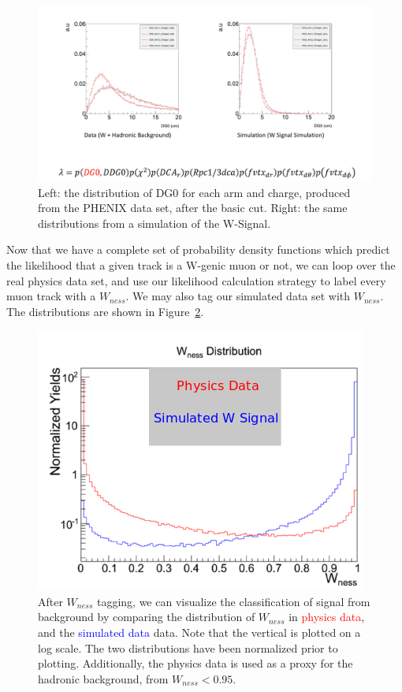 \begin{figure}
  \centering
  \includegraphics[width=\linewidth,trim=4 4 4 4,clip]{./figures/pdf_DG0.png}
  \caption{
    Left: the distribution of DG0 for each arm and charge, produced from the
    PHENIX data set, after the basic cut. Right: the same distributions from a
    simulation of the W-Signal.
  }
  \label{fig:pdf_DG0}
\end{figure}

Now that we have a complete set of probability density functions which predict
the likelihood that a given track is a W-genic muon or not, we can loop over the
real physics data set, and use our likelihood calculation strategy to label
every muon track with a $W_{ness}$. We may also tag our simulated data set with
$W_{ness}$. The distributions are shown in
Figure~\ref{fig:wness_distribution}.

\begin{figure}
  \centering
  \includegraphics[width=0.7\linewidth]{./figures/wness_sig_bak.png}
  \caption{
    After $W_{ness}$ tagging, we can visualize the classification of signal from
    background by comparing the distribution of $W_{ness}$ in
    \textcolor{red}{physics data}, and the \textcolor{blue}{simulated data}
    data. Note that the vertical is plotted on a log scale. The two
    distributions have been normalized prior to plotting. Additionally, the
    physics data is used as a proxy for the hadronic background, from $W_{ness}
    < 0.95$.
  }
  \label{fig:wness_distribution}
\end{figure}

